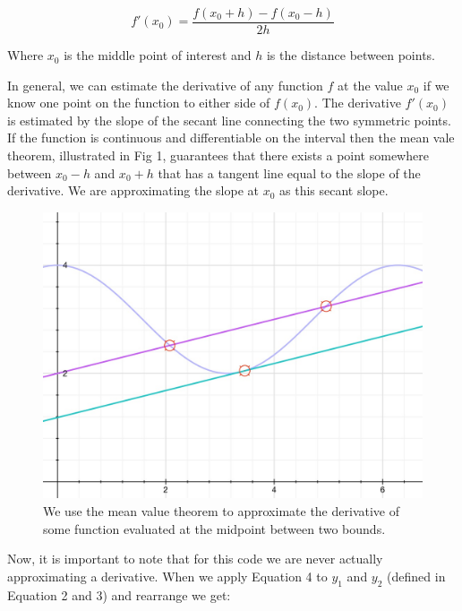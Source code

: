 \documentclass[11pt]{amsart}
\begin{document}
\begin{equation}
f \prime (x_0) = \frac{f(x_0 + h) - f(x_0 - h)}{2h}
\end{equation}
\vspace{2 mm}

Where $x_0$ is the middle point of interest and $h$ is the distance between points.
\newline

In general, we can estimate the derivative of any function $f$ at the value $x_0$ if we know one point on the function to either side of $f(x_0)$.  The derivative $f \prime (x_0)$ is estimated by the slope of the secant line connecting the two symmetric points.  If the function is continuous and differentiable on the interval then the mean vale theorem, illustrated in Fig 1, guarantees that there exists a point somewhere between $x_0 - h$ and $x_0 +h$ that has a tangent line equal to the slope of the derivative.  We are approximating the slope at  $x_0$ as this secant slope.
\newline

\begin{figure}[ht!]
\centering
\includegraphics[width=120mm]{MeanValueTheorem.jpg}
\caption{We use the mean value theorem to approximate the derivative of some function evaluated at the midpoint between two bounds.}
\label{overflow}
\end{figure}

\vspace{3 mm}

Now, it is important to note that for this code we are never actually approximating a derivative.  When we apply Equation 4 to $y_1$ and $y_2$ (defined in Equation 2 and 3) and rearrange we get:
\end{document}
